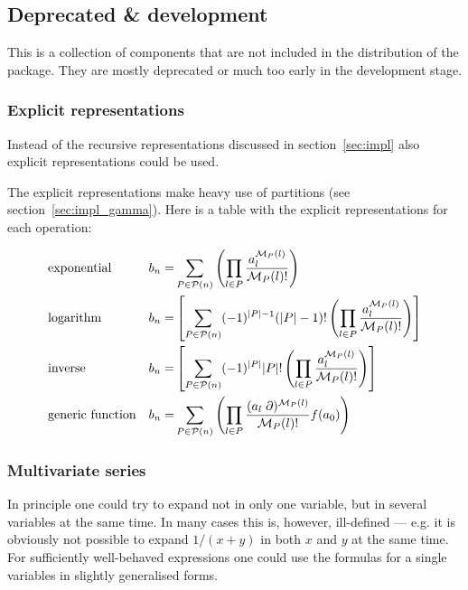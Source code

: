 \documentclass{article}
\begin{document}
\subsection{Deprecated \& development}
\label{sec:depr}

This is a collection of components that are not included in the
distribution of the package. They are mostly deprecated or much too
early in the development stage.

\subsubsection{Explicit representations}

Instead of the recursive representations discussed in
section~\ref{sec:impl} also explicit representations could be used.

The explicit representations make heavy use of partitions (see section~\ref{sec:impl_gamma}).
Here is a table with the explicit representations for each operation:


\begin{align}
  &\text{exponential} & b_n=& \sum_{P \in {\cal P}(n)} \left(\prod_{l \in P}
    \frac{a^{{\cal M}_P(l)}_l}{{\cal M}_P(l)!} \right)
  \notag\\
  &\text{logarithm} & b_n=&\left[\sum_{P \in {\cal P}(n)}
    (-1)^{|P|-1}(|P|-1)!\left(\prod_{l \in P} \frac{a^{{\cal
            M}_P(l)}_l}{{\cal M}_P(l)!} \right)\right]
  \notag\\
  &\text{inverse} & b_n=&\left[\sum_{P \in {\cal P}(n)}
    (-1)^{|P|}|P|!\left(\prod_{l \in P} \frac{a^{{\cal M}_P(l)}_l}{{\cal
          M}_P(l)!} \right)\right]
  \notag\\
  &\text{generic function}& b_n=& \sum_{P \in {\cal P}(n)} \left(\prod_{l \in P}
    \frac{(a_l \;\partial)^{{\cal M}_P(l)}}{{\cal M}_P(l)!}
    f(a_0)\right)
\label{eq:expl}
\end{align}

\subsubsection{Multivariate series}
\label{sec:multi_var}

In principle one could try to expand not in only one variable, but in
several variables at the same time. In many cases this is, however,
ill-defined --- e.g. it is obviously not possible to expand $1/(x+y)$ in
both $x$ and $y$ at the same time. For sufficiently well-behaved
expressions one could use the formulas for a single variables in slightly
generalised forms.
\end{document}
